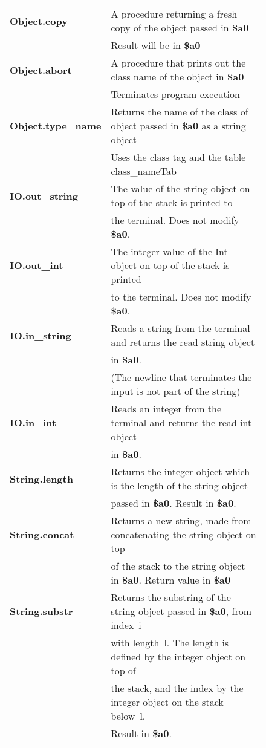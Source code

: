 \documentclass[11pt]{article}
\def\C#1{{\bf{}#1}}
\begin{document}
\begin{figure}
\begin{center}
\begin{tabular}{|l|l|}
\hline
\C{Object.copy}	& A procedure returning a fresh copy of the object
passed in \C{\$a0} \\
		& Result will be in \C{\$a0}\\
\C{Object.abort}	& A procedure that prints out the class name of the
object in \C{\$a0} \\
		& Terminates program execution\\
\C{Object.type\_name}	& Returns the name of the class of object
passed in \C{\$a0} as a string object\\
		& Uses the class tag and the table class\_nameTab\\
\hline
\C{IO.out\_string}	& The value of the string object on top of the stack
is printed to \\
		& the terminal. Does not modify \C{\$a0}.\\
\C{IO.out\_int}	& The integer value of the Int object on top of the
stack is printed\\
		&  to the terminal. Does not modify \C{\$a0}.\\
\C{IO.in\_string}	& Reads a string from the terminal and returns the read
string object\\
		& in \C{\$a0}.\\
		& (The newline that terminates the input is not part
of the string)\\
\C{IO.in\_int}	& Reads an integer from the terminal and returns the read
int object\\
		& in \C{\$a0}. \\
\hline
\C{String.length}	& Returns the integer object which is the length of the string
object\\
		& passed in \C{\$a0}. Result in \C{\$a0}.\\
\C{String.concat}	& Returns a new string, made from concatenating the
string object on top \\
		& of the stack to the string object in \C{\$a0}. Return
value in \C{\$a0}\\
\C{String.substr}	& Returns the substring of the string object passed in
\C{\$a0}, from index~i\\
		& with length~l. The length is defined by the integer
object on top of\\
		& the stack, and the index by the integer object on
the stack below~l.\\
		& Result in \C{\$a0}.\\

\end{tabular}
\end{center}
\end{figure}
\end{document}

